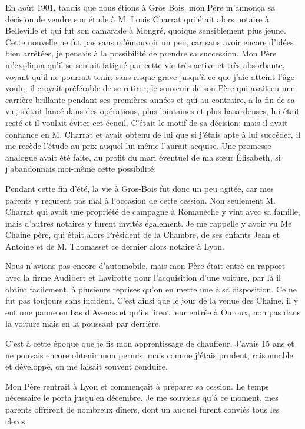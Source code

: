 \documentclass[11pt,a4paper]{report}
\begin{document}
En août 1901, tandis que nous étions à Gros Bois, mon Père m'annonça sa décision de vendre son étude à M. Louis Charrat qui était alors notaire à Belleville et qui fut son camarade à Mongré, quoique sensiblement plus jeune. Cette nouvelle ne fut pas sans m'émouvoir un peu, car sans avoir encore d'idées bien arrêtées, je pensais à la possibilité de prendre sa succession. Mon Père m'expliqua qu'il se sentait fatigué par cette vie très active et très absorbante, voyant qu'il ne pourrait tenir, sans risque grave jusqu'à ce que j'aie atteint l'âge voulu, il croyait préférable de se retirer; le souvenir de son Père qui avait eu une carrière brillante pendant ses premières années et qui au contraire, à la fin de sa vie, s'était lancé dans des opérations, plus lointaines et plus hasardeuses, lui était resté et il voulait éviter cet écueil. C'était le motif de sa décision; mais il avait confiance en M. Charrat et avait obtenu de lui que si j'étais apte à lui succéder, il me recède l'étude au prix auquel lui-même l'aurait acquise. Une promesse analogue avait été faite, au profit du mari éventuel de ma sœur Élisabeth, si j'abandonnais moi-même cette possibilité.

Pendant cette fin d'été, la vie à Gros-Bois fut donc un peu agitée, car mes parents y reçurent pas mal à l'occasion de cette cession. Non seulement M. Charrat qui avait une propriété de campagne à Romanèche y vint avec sa famille, mais d'autres notaires y furent invités également. Je me rappelle y avoir vu Me Chaine père, qui était alors Président de la Chambre, de ses enfants Jean et Antoine et de M. Thomasset ce dernier alors notaire à Lyon.

Nous n'avions pas encore d'automobile, mais mon Père était entré en rapport avec la firme Audibert et Lavirotte pour l'acquisition d'une voiture, par là il obtint facilement, à plusieurs reprises qu'on en mette une à sa disposition. Ce ne fut pas toujours sans incident. C'est ainsi que le jour de la venue des Chaine, il y eut une panne en bas d'Avenas et qu'ils firent leur entrée à Ouroux, non pas dans la voiture mais en la poussant par derrière.

C'est à cette époque que je fis mon apprentissage de chauffeur. J'avais 15 ans et ne pouvais encore obtenir mon permis, mais comme j'étais prudent, raisonnable et développé, on me faisait souvent conduire.

Mon Père rentrait à Lyon et commençait à préparer sa cession. Le temps nécessaire le porta jusqu'en décembre. Je me souviens qu'à ce moment, mes parents offrirent de nombreux dîners, dont un auquel furent conviés tous les clercs.
\end{document}
